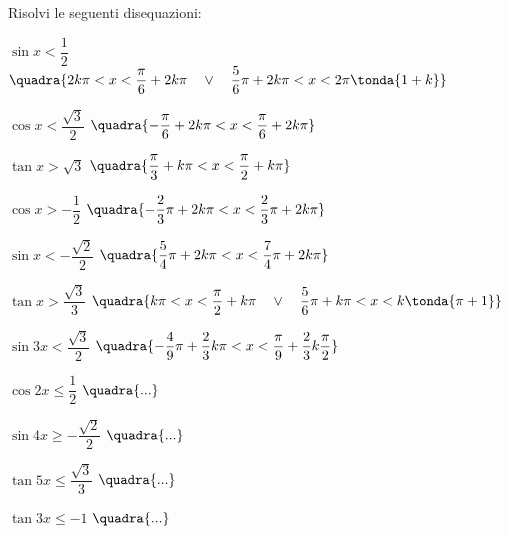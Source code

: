 \begin{esercizio}\label{ese:03.1}
Risolvi le seguenti disequazioni:
 \begin{enumeratea}
  \item \(\sin x < \dfrac{1}{2}\)
   \hfill\(\quadra{2 k \pi < x < \dfrac{\pi}{6} + 2 k \pi \quad \vee \quad 
                  \dfrac{5}{6}\pi + 2 k \pi < x < 2 \pi \tonda{1 + k}}\)
  \item \(\cos x < \dfrac{\sqrt{3}}{2}\)
   \hfill\(\quadra{-\dfrac{\pi}{6} + 2 k \pi < x < \dfrac{\pi}{6} + 2 k \pi}\)
  \item \(\tan x > \sqrt{3}\)
   \hfill\(\quadra{\dfrac{\pi}{3} + k \pi < x < \dfrac{\pi}{2} + k \pi}\)
  \item \(\cos x > - \dfrac{1}{2}\)
   \hfill\(\quadra{-\dfrac{2}{3}\pi + 2 k \pi < x < \dfrac{2}{3} \pi + 2 k \pi}\)
  \item \(\sin x < - \dfrac{\sqrt{2}}{2}\)
   \hfill\(\quadra{\dfrac{5}{4}\pi + 2 k \pi < x < \dfrac{7}{4} \pi + 2 k \pi}\)
  \item \(\tan x > \dfrac{\sqrt{3}}{3}\)
   \hfill\(\quadra{k \pi < x < \dfrac{\pi}{2} + k \pi \quad \vee \quad 
                  \dfrac{5}{6}\pi + k \pi < x < k \tonda{\pi + 1}}\)
  \item \(\sin 3 x < \dfrac{\sqrt{3}}{2}\)
   \hfill\(\quadra{- \dfrac{4}{9} \pi +\dfrac{2}{3} k \pi < x < 
                    \dfrac{\pi}{9} + \dfrac{2}{3} k \dfrac{\pi}{2}}\)
  \item \(\cos 2 x \leqslant \dfrac{1}{2}\)
   \hfill\(\quadra{...}\)
  \item \(\sin 4 x \geqslant - \dfrac{\sqrt{2}}{2}\)
   \hfill\(\quadra{...}\)
  \item \(\tan 5 x \leqslant \dfrac{\sqrt{3}}{3}\)
   \hfill\(\quadra{...}\)
  \item \(\tan 3 x \leqslant -1 \)
   \hfill\(\quadra{...}\)
 \end{enumeratea}
\end{esercizio}
% 
% 
% 
% 
% 
